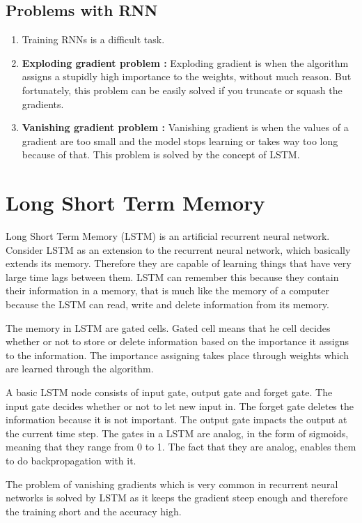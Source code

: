 \subsection{Problems with RNN}

\begin{enumerate}[align=left]

	\item Training RNNs is a difficult task.

	\item \textbf{Exploding gradient problem :} Exploding gradient is when
		the algorithm assigns a stupidly high importance to the weights,
		without much reason. But fortunately, this problem can be easily
		solved if you truncate or squash the gradients.

	\item \textbf{Vanishing gradient problem :} Vanishing gradient is when
		the values of a gradient are too small and the model stops
		learning or takes way too long because of that. This problem is
		solved by the concept of LSTM.

\end{enumerate}

\section{Long Short Term Memory}

Long Short Term Memory (LSTM) is an artificial recurrent neural network.
Consider LSTM as an extension to the recurrent neural network, which basically
extends its memory. Therefore they are capable of learning things that have very
large time lags between them. LSTM can remember this because they contain their
information in a memory, that is much like the memory of a computer because the
LSTM can read, write and delete information from its memory.

The memory in LSTM are gated cells. Gated cell means that he cell decides
whether or not to store or delete information based on the importance it assigns
to the information. The importance assigning takes place through weights which
are learned through the algorithm.


A basic LSTM node consists of input gate, output gate and forget gate. The input
gate decides whether or not to let new input in. The forget gate deletes the
information because it is not important. The output gate impacts the output at
the current time step. The gates in a LSTM are analog, in the form of sigmoids,
meaning that they range from 0 to 1. The fact that they are analog, enables them
to do backpropagation with it.

The problem of vanishing gradients which is very common in recurrent neural
networks is solved by LSTM as it keeps the gradient steep enough and therefore
the training short and the accuracy high.
